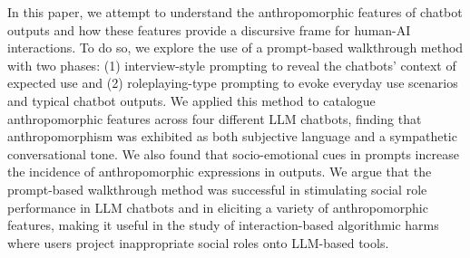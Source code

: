 

In this paper, we attempt to understand the anthropomorphic features of chatbot outputs and how these features provide a discursive frame for human-AI interactions. To do so, we explore the use of a prompt-based walkthrough method with two phases: (1) interview-style prompting to reveal the chatbots' context of expected use and (2) roleplaying-type prompting to evoke everyday use scenarios and typical chatbot outputs. We applied this method to catalogue anthropomorphic features across four different LLM chatbots, finding that anthropomorphism was exhibited as both subjective language and a sympathetic conversational tone. We also found that socio-emotional cues in prompts increase the incidence of anthropomorphic expressions in outputs. We argue that the prompt-based walkthrough method was successful in stimulating social role performance in LLM chatbots and in eliciting a variety of anthropomorphic features, making it useful in the study of interaction-based algorithmic harms where users project inappropriate social roles onto LLM-based tools. 